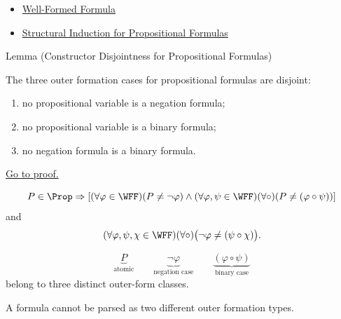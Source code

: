 \begin{dependencies}
\begin{itemize}
  \item \hyperref[def:well-formed-formula]{Well-Formed Formula}
  \item \hyperref[thm:structural-induction-propositional-formulas]{Structural Induction for Propositional Formulas}
\end{itemize}
\end{dependencies}
\begin{lemmabox}{Lemma (Constructor Disjointness for Propositional Formulas)}
\begin{lemma}
\label{lem:constructor-disjointness-propositional-formulas}
The three outer formation cases for propositional formulas are disjoint:
\begin{enumerate}
\item no propositional variable is a negation formula;
\item no propositional variable is a binary formula;
\item no negation formula is a binary formula.
\end{enumerate}

\noindent\hyperref[prf:constructor-disjointness-propositional-formulas]{Go to proof.}
\end{lemma}
\end{lemmabox}

\begin{remark*}
\[
P\in\Prop\Rightarrow
\left[
(\forall\varphi\in\WFF)(P\ne\neg\varphi)
\land
(\forall\varphi,\psi\in\WFF)(\forall\circ)(P\ne(\varphi\circ\psi))
\right]
\]
and
\[
(\forall\varphi,\psi,\chi\in\WFF)(\forall\circ)
\bigl(\neg\varphi\ne(\psi\circ\chi)\bigr).
\]
\end{remark*}

\begin{remark*}
\[
\underbrace{P}_{\text{atomic}}
\qquad
\underbrace{\neg\varphi}_{\text{negation case}}
\qquad
\underbrace{(\varphi\circ\psi)}_{\text{binary case}}
\]
belong to three distinct outer-form classes.
\end{remark*}

\begin{remark*}[Interpretation]
A formula cannot be parsed as two different outer formation types.
\end{remark*}

